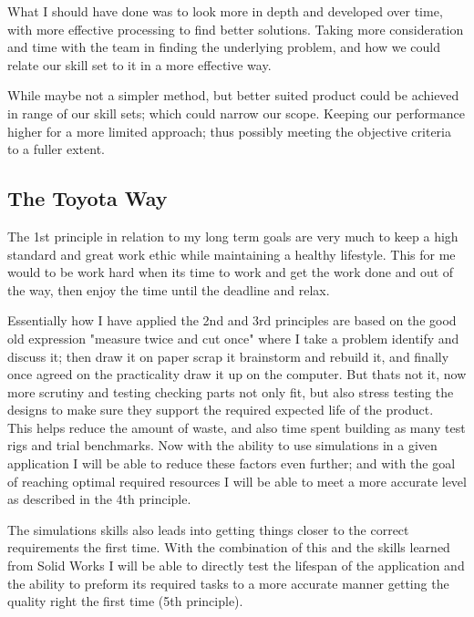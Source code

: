 \documentclass[a4paper, 10pt]{IEEEconf}
\begin{document}
What I should have done was to look more in depth and developed over time, with more effective processing to find better solutions. Taking more consideration and time with the team in finding the underlying problem, and how we could relate our skill set to it in a more effective way. 

While maybe not a simpler method, but better suited product could be achieved in range of our skill sets; which could narrow our scope. Keeping our performance higher for a more limited approach; thus possibly meeting the objective criteria to a fuller extent. 


\subsection{The Toyota Way}

The 1st principle in relation to my long term goals are very much to keep a high standard and great work ethic while maintaining a healthy lifestyle. This for me would to be work hard when its time to work and get the work done and out of the way, then enjoy the time until the deadline and relax.

Essentially how I have applied the 2nd and 3rd principles are based on the good old expression "measure twice and cut once" where I take a problem identify and discuss it; then draw it on paper scrap it brainstorm and rebuild it, and finally once agreed on the practicality draw it up on the computer. But thats not it, now more scrutiny and testing checking parts not only fit, but also stress testing the designs to make sure they support the required expected life of the product.
\\

This helps reduce the amount of waste, and also time spent building as many test rigs and trial benchmarks. Now with the ability to use simulations in a given application I will be able to reduce these factors even further; and with the goal of reaching optimal required resources I will be able to meet a more accurate level as described in the 4th principle. 

The simulations skills also leads into getting things closer to the correct requirements the first time. With the combination of this and the skills learned from Solid Works I will be able to directly test the lifespan of the application and the ability to preform its required tasks to a more accurate manner getting the quality right the first time (5th principle). 
\end{document}
